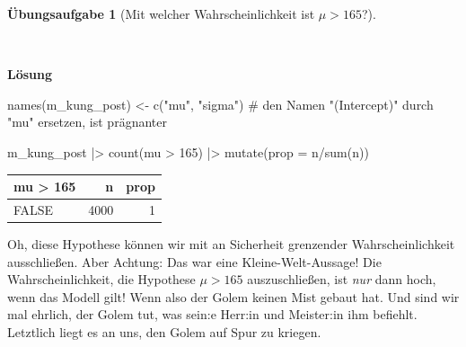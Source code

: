 \documentclass[
  ngerman,
  letterpaper,
  twoside,
  open=any]{scrbook}
\newenvironment{Shaded}{\begin{snugshade}}{\end{snugshade}}
\newcommand{\AttributeTok}[1]{\textcolor[rgb]{0.40,0.45,0.13}{#1}}
\newcommand{\CommentTok}[1]{\textcolor[rgb]{0.37,0.37,0.37}{#1}}
\newcommand{\DecValTok}[1]{\textcolor[rgb]{0.68,0.00,0.00}{#1}}
\newcommand{\FunctionTok}[1]{\textcolor[rgb]{0.28,0.35,0.67}{#1}}
\newcommand{\NormalTok}[1]{\textcolor[rgb]{0.00,0.23,0.31}{#1}}
\newcommand{\OtherTok}[1]{\textcolor[rgb]{0.00,0.23,0.31}{#1}}
\newcommand{\SpecialCharTok}[1]{\textcolor[rgb]{0.37,0.37,0.37}{#1}}
\newcommand{\StringTok}[1]{\textcolor[rgb]{0.13,0.47,0.30}{#1}}
\newcounter{none} %
\theoremstyle{definition}
\theoremstyle{plain}
\theoremstyle{definition}
\newtheorem{exercise}{Übungsaufgabe}[chapter]
\theoremstyle{definition}
\theoremstyle{definition}
\theoremstyle{definition}
\newtheorem{exercise}{Übungsaufgabe}[chapter]
\theoremstyle{remark}
\begin{document}
\begin{exercise}[Mit welcher Wahrscheinlichkeit ist
\(\mu>165\)?]\protect\hypertarget{exr-kung2}{}\label{exr-kung2}

~

\begin{tcolorbox}[enhanced jigsaw, arc=.35mm, bottomrule=.15mm, breakable, colback=white, colframe=quarto-callout-tip-color-frame, left=2mm, leftrule=.75mm, opacityback=0, rightrule=.15mm, toprule=.15mm]

\vspace{-3mm}\textbf{Lösung}\vspace{3mm}

\begin{Shaded}
\begin{Highlighting}[]
\FunctionTok{names}\NormalTok{(m\_kung\_post) }\OtherTok{\textless{}{-}} 
  \FunctionTok{c}\NormalTok{(}\StringTok{"mu"}\NormalTok{, }\StringTok{"sigma"}\NormalTok{)  }\CommentTok{\# den Namen "(Intercept)" durch "mu" ersetzen, ist prägnanter}

\NormalTok{m\_kung\_post }\SpecialCharTok{|\textgreater{}} 
  \FunctionTok{count}\NormalTok{(mu }\SpecialCharTok{\textgreater{}} \DecValTok{165}\NormalTok{) }\SpecialCharTok{|\textgreater{}} 
  \FunctionTok{mutate}\NormalTok{(}\AttributeTok{prop =}\NormalTok{ n}\SpecialCharTok{/}\FunctionTok{sum}\NormalTok{(n))}
\end{Highlighting}
\end{Shaded}

{\def\LTcaptype{none} %
\begin{longtable}[]{@{}lrr@{}}
\toprule\noalign{}
mu \textgreater{} 165 & n & prop \\
\midrule\noalign{}
\endhead
\bottomrule\noalign{}
\endlastfoot
FALSE & 4000 & 1 \\
\end{longtable}
}

Oh, diese Hypothese können wir mit an Sicherheit grenzender
Wahrscheinlichkeit ausschließen. Aber Achtung: Das war eine
Kleine-Welt-Aussage! Die Wahrscheinlichkeit, die Hypothese \(\mu > 165\)
auszuschließen, ist \emph{nur} dann hoch, wenn das Modell gilt! Wenn
also der Golem keinen Mist gebaut hat. Und sind wir mal ehrlich, der
Golem tut, was sein:e Herr:in und Meister:in ihm befiehlt. Letztlich
liegt es an uns, den Golem auf Spur zu kriegen.

\end{tcolorbox}

\end{exercise}
\end{document}
